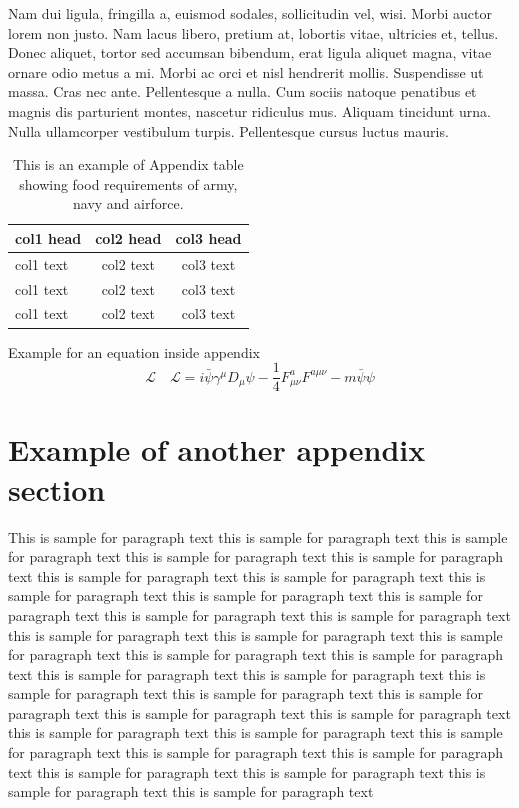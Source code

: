 \documentclass[AMA,STIX1COL]{WileyNJD-SP}
\begin{document}
Nam dui ligula, fringilla a, euismod sodales, sollicitudin vel, wisi. Morbi auctor lorem non justo. Nam lacus libero,
pretium at, lobortis vitae, ultricies et, tellus. Donec aliquet, tortor sed accumsan bibendum, erat ligula aliquet magna,
vitae ornare odio metus a mi. Morbi ac orci et nisl hendrerit mollis. Suspendisse ut massa. Cras nec ante. Pellentesque
a nulla. Cum sociis natoque penatibus et magnis dis parturient montes, nascetur ridiculus mus. Aliquam tincidunt
urna. Nulla ullamcorper vestibulum turpis. Pellentesque cursus luctus mauris.

\begin{center}
\begin{table}[b]%
\centering
\caption{This is an example of Appendix table showing food requirements of army, navy and airforce.\label{tab4}}%
\begin{tabular*}{300pt}{@{\extracolsep\fill}lcc@{\extracolsep\fill}}%
\toprule
\textbf{col1 head} & \textbf{col2 head} & \textbf{col3 head} \\
\midrule
col1 text & col2 text & col3 text \\
col1 text & col2 text & col3 text \\
col1 text & col2 text & col3 text\\
\bottomrule
\end{tabular*}
\end{table}
\end{center}


Example for an equation inside appendix
\begin{equation}
\mathcal{L}\quad \mathbf{\mathcal{L}} = i \bar{\psi} \gamma^\mu D_\mu \psi - \frac{1}{4} F_{\mu\nu}^a F^{a\mu\nu} - m \bar{\psi} \psi\label{eq25}
\end{equation}

\section{Example of another appendix section\label{app3}}%

This is sample for paragraph text this is sample for paragraph text  this is sample for paragraph text this is sample for paragraph text this is sample for paragraph text this is sample for paragraph text this is sample for paragraph text this is sample for paragraph text this is sample for paragraph text this is sample for paragraph text this is sample for paragraph text this is sample for paragraph text this is sample for paragraph text this is sample for paragraph text this is sample for paragraph text this is sample for paragraph text this is sample for paragraph text this is sample for paragraph text this is sample for paragraph text this is sample for paragraph text this is sample for paragraph text this is sample for paragraph text this is sample for paragraph text this is sample for paragraph text this is sample for paragraph text this is sample for paragraph text this is sample for paragraph text this is sample for paragraph text this is sample for paragraph text this is sample for paragraph text this is sample for paragraph text this is sample for paragraph text this is sample for paragraph text
\end{document}
